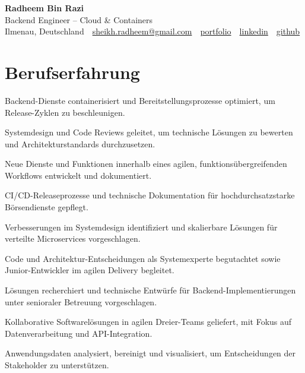 \documentclass[11pt,a4paper]{resume}
\makeatletter
\newcommand{\Portfolio}{https://radheem.github.io/my-cv}
\newcommand{\PortfolioText}{portfolio}
\newcommand{\GitHub}{https://github.com/radheem}
\newcommand{\LinkedIn}{https://www.linkedin.com/in/radheem-razi}
\newcommand{\Email}{sheikh.radheem@gmail.com}
\makeatother
\begin{document}
\clearpage
{}

\begin{center}
  {\huge\bfseries Radheem Bin Razi}\\[3pt]
  {\large Backend Engineer – Cloud \& Containers}\\[6pt]
  \small
  Ilmenau, Deutschland \,\textbar\,
  \href{mailto:\Email}{\Email} \,\textbar\,
  \href{\Portfolio}{\PortfolioText} \,\textbar\,
  \href{\LinkedIn}{linkedin} \,\textbar\,
  \href{\GitHub}{github}
\end{center}
\vspace{2pt}

\section{Berufserfahrung}

\bullets
  \item Backend-Dienste containerisiert und Bereitstellungsprozesse optimiert, um Release-Zyklen zu beschleunigen.
  \item Systemdesign und Code Reviews geleitet, um technische Lösungen zu bewerten und Architekturstandards durchzusetzen.
  \item Neue Dienste und Funktionen innerhalb eines agilen, funktionsübergreifenden Workflows entwickelt und dokumentiert.
\bulletsend
\vspace{3pt}
\bullets
  \item CI/CD-Releaseprozesse und technische Dokumentation für hochdurchsatzstarke Börsendienste gepflegt.
  \item Verbesserungen im Systemdesign identifiziert und skalierbare Lösungen für verteilte Microservices vorgeschlagen.
  \item Code und Architektur-Entscheidungen als Systemexperte begutachtet sowie Junior-Entwickler im agilen Delivery begleitet.
\bulletsend
\vspace{3pt}
\bullets
  \item Lösungen recherchiert und technische Entwürfe für Backend-Implementierungen unter senioraler Betreuung vorgeschlagen.
  \item Kollaborative Softwarelösungen in agilen Dreier-Teams geliefert, mit Fokus auf Datenverarbeitung und API-Integration.
  \item Anwendungsdaten analysiert, bereinigt und visualisiert, um Entscheidungen der Stakeholder zu unterstützen.
\bulletsend
\vspace{3pt}
\end{document}
